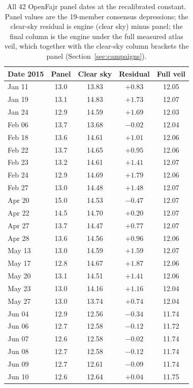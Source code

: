 \documentclass[preprint,12pt]{elsarticle}
\begin{document}
\begin{table}[h]
\centering
\caption{All 42 OpenFajr panel dates at the recalibrated constant.
Panel values are the 19-member consensus depressions; the clear-sky
residual is engine (clear sky) minus panel; the final column is the
engine under the full measured atlas veil, which together with the
clear-sky column brackets the panel (Section~\ref{sec:campaigns}).}
\label{tab:bham}
\scriptsize
\setlength{\tabcolsep}{4pt}
\begin{tabular}{lcccc}
\toprule
Date 2015 & Panel & Clear sky & Residual & Full veil \\
\midrule
Jan 11 & 13.0 & 13.83 & $+0.83$ & 12.05 \\
Jan 19 & 13.1 & 14.83 & $+1.73$ & 12.07 \\
Jan 24 & 12.9 & 14.59 & $+1.69$ & 12.03 \\
Feb 06 & 13.7 & 13.68 & $-0.02$ & 12.04 \\
Feb 18 & 13.6 & 14.61 & $+1.01$ & 12.06 \\
Feb 22 & 13.7 & 14.65 & $+0.95$ & 12.06 \\
Feb 23 & 13.2 & 14.61 & $+1.41$ & 12.07 \\
Feb 24 & 12.9 & 14.69 & $+1.79$ & 12.06 \\
Feb 27 & 13.0 & 14.48 & $+1.48$ & 12.07 \\
Apr 20 & 15.0 & 14.53 & $-0.47$ & 12.07 \\
Apr 22 & 14.5 & 14.70 & $+0.20$ & 12.07 \\
Apr 27 & 13.7 & 14.47 & $+0.77$ & 12.07 \\
Apr 28 & 13.6 & 14.56 & $+0.96$ & 12.06 \\
May 13 & 13.0 & 14.59 & $+1.59$ & 12.07 \\
May 17 & 12.8 & 14.67 & $+1.87$ & 12.06 \\
May 20 & 13.1 & 14.51 & $+1.41$ & 12.06 \\
May 23 & 13.0 & 14.16 & $+1.16$ & 12.04 \\
May 27 & 13.0 & 13.74 & $+0.74$ & 12.04 \\
Jun 04 & 12.9 & 12.56 & $-0.34$ & 11.74 \\
Jun 06 & 12.7 & 12.58 & $-0.12$ & 11.72 \\
Jun 07 & 12.6 & 12.58 & $-0.02$ & 11.74 \\
Jun 08 & 12.7 & 12.58 & $-0.12$ & 11.74 \\
Jun 09 & 12.7 & 12.61 & $-0.09$ & 11.74 \\
Jun 10 & 12.6 & 12.64 & $+0.04$ & 11.75 \\

\end{tabular}
\end{table}
\end{document}
